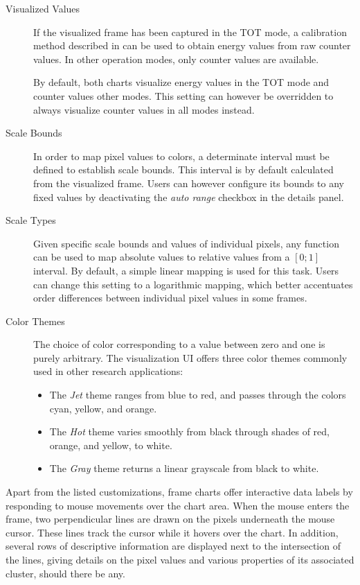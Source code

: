 \begin{description}
	\item[Visualized Values]
	If the visualized frame has been captured in the TOT mode, a calibration method described in \cite{Jakubek2011S262} can be used to obtain energy values from raw counter values. In other operation modes, only counter values are available.

	By default, both charts visualize energy values in the TOT mode and counter values other modes. This setting can however be overridden to always visualize counter values in all modes instead.

	\item[Scale Bounds]
	In order to map pixel values to colors, a determinate interval must be defined to establish scale bounds. This interval is by default calculated from the visualized frame. Users can however configure its bounds to any fixed values by deactivating the \textit{auto range} checkbox in the details panel.

	\item[Scale Types]
	Given specific scale bounds and values of individual pixels, any function can be used to map absolute values to relative values from a $[0;1]$ interval. By default, a simple linear mapping is used for this task. Users can change this setting to a logarithmic mapping, which better accentuates order differences between individual pixel values in some frames.

	\item[Color Themes]
	The choice of color corresponding to a value between zero and one is purely arbitrary. The visualization UI offers three color themes commonly used in other research applications:

	\begin{itemize}
		\item The \textit{Jet} theme ranges from blue to red, and passes through the colors cyan, yellow, and orange.
		\item The \textit{Hot} theme varies smoothly from black through shades of red, orange, and yellow, to white.
		\item The \textit{Gray} theme returns a linear grayscale from black to white.
	\end{itemize}
\end{description}

Apart from the listed customizations, frame charts offer interactive data labels by responding to mouse movements over the chart area. When the mouse enters the frame, two perpendicular lines are drawn on the pixels underneath the mouse cursor. These lines track the cursor while it hovers over the chart. In addition, several rows of descriptive information are displayed next to the intersection of the lines, giving details on the pixel values and various properties of its associated cluster, should there be any.

